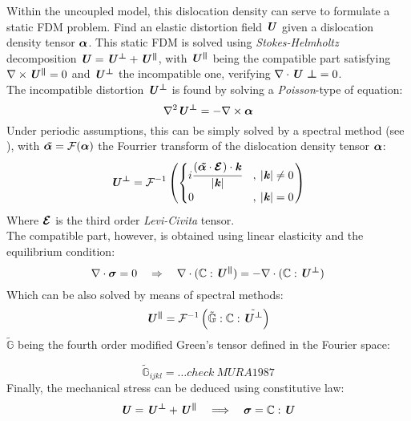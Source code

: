 \documentclass{article}
\begin{document}
Within the uncoupled model, this dislocation density can serve to formulate a static FDM problem. Find an elastic distortion field $\bm{\mathit{U}}$ given a dislocation density tensor $\bm{\mathit{\alpha}}$. This static FDM is solved using \emph{Stokes-Helmholtz} decomposition $\bm{\mathit{U}} = \bm{\mathit{U^\perp}}+\bm{\mathit{U^\parallel}}$, with $\bm{\mathit{U^\parallel}}$ being the compatible part satisfying $\nabla \times \bm{\mathit{U^\parallel}}=0$ and  $\bm{\mathit{U^\perp}}$ the incompatible one, verifying $\nabla \cdot \bm{\mathit{U\perp}}=0$.\\
The incompatible distortion $\bm{\mathit{U^\perp}}$ is found by solving a \emph{Poisson}-type of equation:
\begin{equation}
   \nabla^2 \bm{\mathit{U^\perp}} = - \nabla \times \bm{\mathit{\alpha}}
\end{equation}
Under periodic assumptions, this can be simply solved by a spectral method (see \cite{upadhyayCouplingPhase2024}), with $\bm{\mathit{\tilde{\alpha}}}= \mathcal{F}(\mathcal{\bm{\mathit{\alpha}}})$ the Fourrier transform of the dislocation density tensor $\bm{\mathit{\alpha}}$:
\begin{equation}
   \bm{\mathit{U^\perp}} = \mathcal{F}^{-1}\left(
      \begin{cases}
         i\cfrac{(\bm{\mathit{\tilde{\alpha}}}\cdot{\bm{\mathcal{E}_{}}})\cdot \bm{\mathit{k}}}{|\bm{\mathit{k}}|}&, \: |\bm{\mathit{k}}|\neq 0\\
         0&, \: |\bm{\mathit{k}}|= 0\\
      \end{cases}
   \right)
\end{equation}
Where ${\bm{\mathcal{E}_{}}}$ is the third order \emph{Levi-Civita} tensor.\\


The compatible part, however, is obtained using linear elasticity and the equilibrium condition:
\begin{equation}
   \nabla \cdot \bm{\mathit{\sigma}} = 0 \quad \Rightarrow \quad \nabla \cdot(\mathbb{C}: \bm{\mathit{U^\parallel}}) = -\nabla \cdot(\mathbb{C}: \bm{\mathit{U^\perp}})
\end{equation}
Which can be also solved by means of spectral methods:
\begin{equation}
   \bm{\mathit{U^\parallel}} = \mathcal{F}^{-1}\left( \tilde{\mathbb{G}} : \mathbb{C}:\tilde{\bm{\mathit{U^\perp}}}\right)
\end{equation}
$\tilde{\mathbb{G}}$ being the fourth order modified Green's tensor defined in the Fourier space:

\begin{equation}
   \tilde{\mathbb{G}}_{ijkl} = \dots check \: MURA1987
\end{equation}
Finally, the mechanical stress can be deduced using constitutive law:
\begin{equation}
   \bm{\mathit{U}} =\bm{\mathit{U^\perp}} +\bm{\mathit{U^\parallel}} \quad \Longrightarrow \quad \bm{\mathit{\sigma}} = \mathbb{C}:\bm{\mathit{U}} 
\end{equation}
\end{document}
